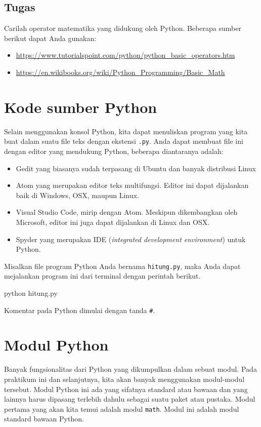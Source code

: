 \documentclass[a4paper,11pt]{extarticle}
\begin{document}
\subsection*{Tugas}

Carilah operator matematika yang didukung oleh Python.
Beberapa sumber berikut dapat Anda gunakan:
\begin{itemize}
\item \url{https://www.tutorialspoint.com/python/python_basic_operators.htm}
\item \url{https://en.wikibooks.org/wiki/Python_Programming/Basic_Math}
\end{itemize}


\section{Kode sumber Python}

Selain menggunakan konsol Python, kita dapat menuliskan program
yang kita buat dalam suatu file teks dengan ekstensi \texttt{.py}.
Anda dapat membuat file ini dengan editor yang mendukung Python, beberapa
diantaranya adalah:
\begin{itemize}
\item \textsf{Gedit} yang biasanya sudah terpasang di Ubuntu dan banyak distribusi
Linux
\item \textsf{Atom} yang merupakan editor teks multifungsi. Editor ini dapat
dijalankan baik di Windows, OSX, maupun Linux.
\item \textsf{Visual Studio Code}, mirip dengan \textsf{Atom}.
Meskipun dikembangkan oleh Microsoft, editor ini juga dapat dijalankan di Linux dan
OSX.
\item \textsf{Spyder} yang merupakan IDE (\textit{integrated development environment}) untuk
Python.
\end{itemize}

Misalkan file program Python Anda bernama \texttt{hitung.py}, maka Anda dapat
mejalankan program ini dari terminal dengan perintah berikut.
\begin{textcode}
python hitung.py
\end{textcode}

Komentar pada Python dimulai dengan tanda \verb|#|.

\section{Modul Python}

Banyak fungsionalitas dari Python yang dikumpulkan dalam sebuat modul.
Pada praktikum ini dan selanjutnya, kita akan banyak menggunakan modul-modul
tersebut.
Modul Python ini ada yang sifatnya standard atau bawaan dan yang lainnya
harus dipasang terlebih dahulu sebagai suatu paket atau pustaka.
Modul pertama yang akan kita temui adalah modul \texttt{math}. Modul ini
adalah modul standard bawaan Python.
\end{document}
